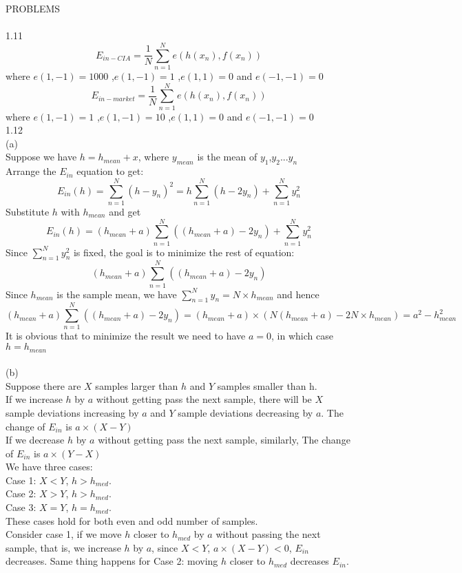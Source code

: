 \documentclass[12pt]{article}
\begin{document}
PROBLEMS\\\\
1.11\\

$$E_{in-CIA} = \frac{1}{N}\sum_{n=1}^{N}e(h(x_n),f(x_n))$$ where $e(1,-1)=1000$ ,$e(1,-1)=1$ ,$e(1,1)=0$ and $e(-1,-1)=0$\\

$$E_{in-market} = \frac{1}{N}\sum_{n=1}^{N}e(h(x_n),f(x_n))$$ where $e(1,-1)=1$ ,$e(1,-1)=10$ ,$e(1,1)=0$ and $e(-1,-1)=0$\\
1.12\\
(a)\\
Suppose we have $h=h_{mean}+x$, where $y_{mean}$ is the mean of $y_1$,$y_2$...$y_n$\\
Arrange the $E_{in}$ equation to get:
$$E_{in}(h) = \sum_{n=1}^{N}(h-y_n)^2 = h\sum_{n=1}^{N}(h-2y_n)+\sum_{n=1}^{N}y_n^2$$
Substitute $h$ with $h_{mean}$ and get
$$E_{in}(h) = (h_{mean}+a)\sum_{n=1}^{N}((h_{mean}+a)-2y_n)+\sum_{n=1}^{N}y_n^2$$
Since $\sum_{n=1}^{N}y_n^2$ is fixed, the goal is to minimize the rest of equation: $$(h_{mean}+a)\sum_{n=1}^{N}((h_{mean}+a)-2y_n)$$
Since $h_{mean}$ is the sample mean, we have $\sum_{n=1}^{N}y_n=N\times h_{mean}$ and hence $$(h_{mean}+a)\sum_{n=1}^{N}((h_{mean}+a)-2y_n) = (h_{mean}+a)\times(N(h_{mean}+a)-2N\times h_{mean})=a^2-h_{mean}^2$$
It is obvious that to minimize the result we need to have $a=0$, in which case $h=h_{mean}$\\\\
(b)\\
Suppose there are $X$ samples larger than $h$ and $Y$ samples smaller than h.\\
If we increase $h$ by $a$ without getting pass the next sample, there will be $X$ sample deviations increasing by $a$ and $Y$ sample deviations decreasing by $a$. The change of $E_{in}$ is $a\times(X-Y)$\\
If we decrease $h$ by $a$ without getting pass the next sample, similarly, The change of $E_{in}$ is $a\times(Y-X)$\\
We have three cases:\\
Case 1: $X<Y$, $h>h_{med}$.\\
Case 2: $X>Y$, $h>h_{med}$.\\
Case 3: $X=Y$, $h=h_{med}$.\\ 
These cases hold for both even and odd number of samples.\\
Consider case 1, if we move $h$ closer to $h_{med}$ by $a$ without passing the next sample, that is, we increase $h$ by $a$, since $X<Y$, $a\times(X-Y)<0$, $E_{in}$ decreases. Same thing happens for Case 2: moving $h$ closer to $h_{med}$ decreases $E_{in}$. \\
\end{document}
